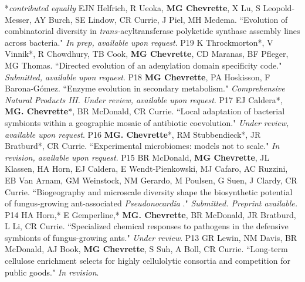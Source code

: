 


\begin{cvpubs}
  \cvpub
    {\hspace{-1cm} *\textit{contributed equally}} %
    {} %
  \cvpub
    {EJN Helfrich, R Ueoka, \textbf{MG Chevrette}, X Lu, S Leopold-Messer, AY Burch, SE Lindow, CR Currie, J Piel, MH Medema. ``Evolution of combinatorial diversity in \textit{trans-}acyltransferase polyketide synthase assembly lines across bacteria." \textit{In prep, available upon request}.
    } %
    {P19}
   \cvpub
    {K Throckmorton*, V Vinnik*, R Chowdhury, TB Cook, \textbf{MG Chevrette}, CD Maranas, BF Pfleger, MG Thomas. ``Directed evolution of an adenylation domain specificity code." \textit{Submitted, available upon request}.
    } %
    {P18}
   \cvpub
    {\textbf{MG Chevrette}, PA Hoskisson, F Barona-G\'{o}mez. ``Enzyme evolution in secondary metabolism." \textit{Comprehensive Natural Products III. Under review, available upon request}.
    } %
    {P17}
   \cvpub
    {EJ Caldera*, \textbf{MG. Chevrette}*, BR McDonald, CR Currie. ``Local adaptation of bacterial symbionts within a geographic mosaic of antibiotic coevolution." \textit{Under review, available upon request}.
    } %
    {P16}
   \cvpub
    {\textbf{MG. Chevrette}*, RM Stubbendieck*, JR Bratburd*, CR Currie. ``Experimental microbiomes: models not to scale." \textit{In revision, available upon request}.
    } %
    {P15} %
   \cvpub
    {BR McDonald, \textbf{MG Chevrette}, JL Klassen, HA Horn, EJ Caldera, E Wendt-Pienkowski, MJ Cafaro, AC Ruzzini, EB Van Arnam, GM Weinstock, NM Gerardo, M Poulsen, G Suen, J Clardy, CR Currie. ``Biogeography and microscale diversity shape the biosynthetic potential of fungus-growing ant-associated \textit{Pseudonocardia}
." \textit{Submitted. Preprint available. \textbf{}}
    } %
    {P14} %
  \cvpub
    {HA Horn,* E Gemperline,* \textbf{MG. Chevrette}, BR McDonald, JR Bratburd, L Li, CR Currie. ``Specialized chemical responses to pathogens in the defensive symbionts of fungus-growing ants." \textit{Under review}.
    } %
    {P13} %
  \cvpub
    {GR Lewin, NM Davis, BR McDonald, AJ Book, \textbf{MG Chevrette}, S Suh, A Boll, CR Currie. ``Long-term cellulose enrichment selects for highly cellulolytic consortia and competition for public goods." \textit{In revision}.
}
\end{cvpubs}
